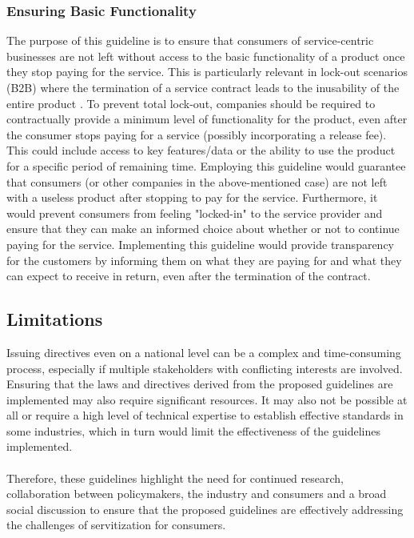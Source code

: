 \documentclass[sigplan,screen,nonacm]{acmart}
\begin{document}
\subsubsection{Ensuring Basic Functionality}
The purpose of this guideline is to ensure that consumers of service-centric businesses are not left without access 
to the basic functionality of a product once they stop paying for the service. This is particularly relevant 
in lock-out scenarios (B2B) where the termination of a service contract leads to the inusability of the entire product \cite{mosch2021trapped}. \newline
To prevent total lock-out, companies should be required to contractually provide a minimum level of functionality for the product, even after the consumer stops paying for a service (possibly incorporating a release fee).
This could include access to key features/data or the ability to use the product for a specific
period of remaining time. 
Employing this guideline would guarantee that consumers (or other companies in the above-mentioned case) are not left with a useless product after stopping to pay for the service. 
Furthermore, it would prevent consumers from feeling "locked-in" to the service provider and ensure that they can make an informed choice about whether or not to continue paying for the service. 
Implementing this guideline would provide transparency for the customers by informing them on what they are paying for and what 
they can expect to receive in return, even after the termination of the contract. 


\subsection{Limitations}
Issuing directives even on a national level can be a complex and time-consuming process, especially if multiple stakeholders with conflicting interests are involved. Ensuring that the laws and directives derived from the proposed guidelines are implemented may also require significant resources. 
It may also not be possible at all or require a high level of technical expertise to establish effective standards in some industries, which in turn would limit the effectiveness of the guidelines implemented. 
\\\\
Therefore, these guidelines highlight the need for continued research, collaboration between policymakers, the industry and consumers and a broad social discussion to ensure that the proposed guidelines are effectively addressing the challenges of servitization for consumers. 
\end{document}
